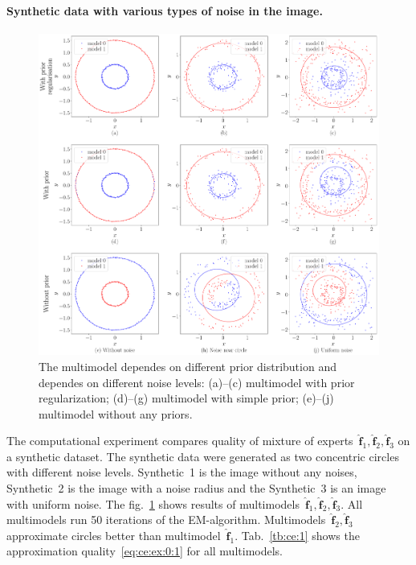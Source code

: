 \documentclass[12pt, twoside]{article}
\numberwithin{equation}{section}
\begin{document}
\paragraph{Synthetic data with various types of noise in the image.}
\begin{figure}[h!t]\center
\includegraphics[width=1\textwidth]{result_eng/experiment_synthetic}
\caption{The multimodel dependes on different prior distribution and dependes on different noise levels: (a)--(c) multimodel with prior regularization; (d)--(g) multimodel with simple prior; (e)--(j) multimodel without any priors.}
\label{experiment:1}
\end{figure}
The computational experiment compares quality of mixture of experts~$\hat{\mathbf{f}}_1, \hat{\mathbf{f}}_2, \hat{\mathbf{f}}_3$ on a synthetic dataset.
The synthetic data were generated as two concentric circles with different noise levels.
Synthetic~1 is the image without any noises, Synthetic~2 is the image with a noise radius and the Synthetic~3 is an image with uniform noise.
The fig.~\ref{experiment:1} shows results of multimodels~$\hat{\mathbf{f}}_1, \hat{\mathbf{f}}_2, \hat{\mathbf{f}}_3$.
All multimodels run 50 iterations of the EM-algorithm.
Multimodels~$\hat{\mathbf{f}}_2, \hat{\mathbf{f}}_3$ approximate circles better than multimodel~$\hat{\mathbf{f}}_1$. Tab.~\ref{tb:ce:1} shows the approximation quality~\eqref{eq:ce:ex:0:1} for all multimodels.
\end{document}
